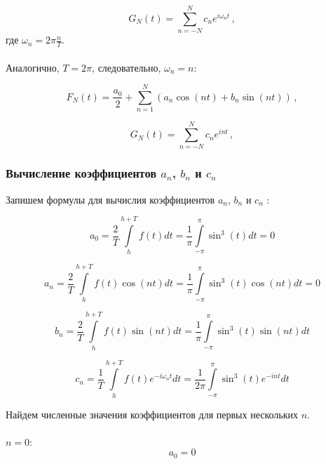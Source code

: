 \documentclass[a5paper, 10pt]{article}
\theoremstyle{definition}
\theoremstyle{plain}
\theoremstyle{remark}
\begin{document}
\begin{equation}
G_N (t) = \sum  \limits_{n=-N}^N c_n e^{i \omega_n t} \, ,
\end{equation}
где $\omega_n = 2 \pi \frac{n}{T}$.\\
\\
Аналогично, $T = 2 \pi$, следовательно, $\omega_n = n$:

\begin{equation}
F_N(t) = \frac{a_0}{2} + \sum  \limits_{n=1}^N \left( a_n \cos \left( n t \right) + b_n \sin \left( n t \right)  \right) \, ,
\end{equation}

\begin{equation}
G_N (t) = \sum  \limits_{n=-N}^N c_n e^{i n t} \, ,
\end{equation}





\subsubsection{Вычисление коэффициентов $a_n$, $b_n$ и $c_n$}

Запишем формулы для вычислия коэффициентов $a_n$, $b_n$ и $c_n$ :

\begin{equation}
a_0 =  \frac{2}{T} \int \limits_{h}^{h + T} f(t) dt =   \frac{1}{\pi} \int \limits_{-\pi}^{\pi} \sin^3(t) dt = 0
\end{equation}


\begin{equation}
a_n = \frac{2}{T} \int \limits_{h}^{h + T} f(t) \cos (nt) dt =  \frac{1}{\pi} \int \limits_{-\pi}^{\pi} \sin^3(t) \cos (nt) dt = 0
\end{equation}

\begin{equation}
b_n = \frac{2}{T} \int \limits_{h}^{h + T} f(t) \sin (nt) dt =  \frac{1}{\pi} \int \limits_{-\pi}^{\pi} \sin^3(t) \sin (nt) dt 
\end{equation}

\begin{equation}
c_n = \frac{1}{T} \int \limits_{h}^{h + T} f(t) e^{-i \omega_n t} dt =  \frac{1}{2 \pi} \int \limits_{-\pi}^{\pi} \sin^3(t) e^{-i n t} dt  
\end{equation}

Найдем численные значения коэффициентов для первых нескольких $n$. \\
\\
$n = 0:$
\begin{equation}
a_0  = 0
\end{equation}
\end{document}
